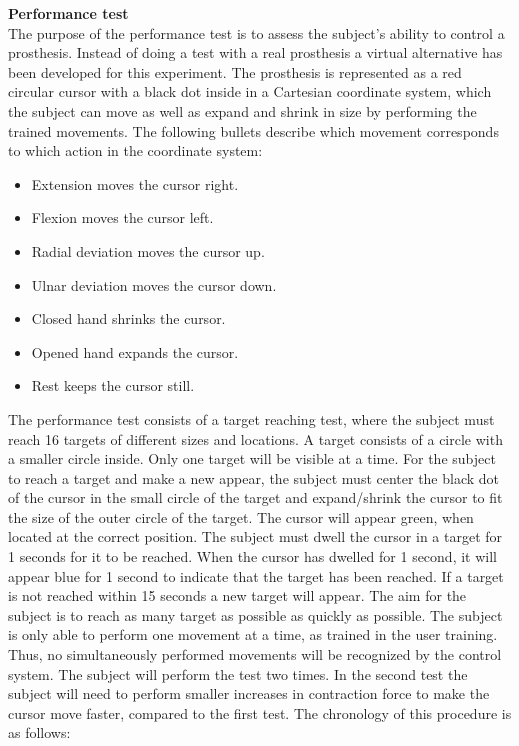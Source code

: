 \textbf{Performance test} \\
The purpose of the performance test is to assess the subject's ability to control a prosthesis. Instead of doing a test with a real prosthesis a virtual alternative has been developed for this experiment. The prosthesis is represented as a red circular cursor with a black dot inside in a Cartesian coordinate system, which the subject can move as well as expand and shrink in size by performing the trained movements. The following bullets describe which movement corresponds to which action in the coordinate system:

\begin{itemize}
	\item Extension moves the cursor right.
	\item Flexion moves the cursor left.
	\item Radial deviation moves the cursor up.
	\item Ulnar deviation moves the cursor down.
	\item Closed hand shrinks the cursor.
	\item Opened hand expands the cursor.
	\item Rest keeps the cursor still.
\end{itemize}

 The performance test consists of a target reaching test, where the subject must reach 16 targets of different sizes and locations. A target consists of a circle with a smaller circle inside. Only one target will be visible at a time. For the subject to reach a target and make a new appear, the subject must center the black dot of the cursor in the small circle of the target and expand/shrink the cursor to fit the size of the outer circle of the target. The cursor will appear green, when located at the correct position. The subject must dwell the cursor in a target for 1 seconds for it to be reached. When the cursor has dwelled for 1 second, it will appear blue for 1 second to indicate that the target has been reached. If a target is not reached within 15 seconds a new target will appear. The aim for the subject is to reach as many target as possible as quickly as possible. The subject is only able to perform one movement at a time, as trained in the user training. Thus, no simultaneously performed movements will be recognized by the control system. The subject will perform the test two times. In the second test the subject will need to perform smaller increases in contraction force to make the cursor move faster, compared to the first test. The chronology of this procedure is as follows:

